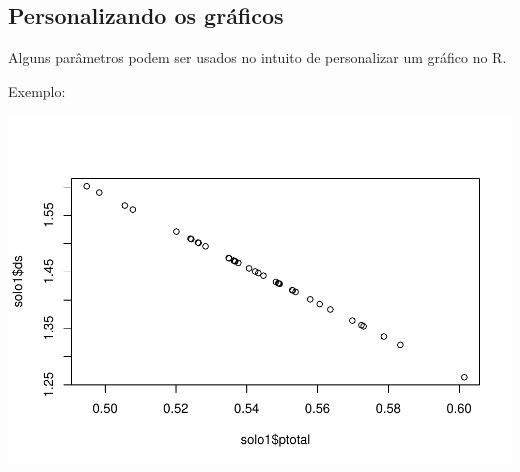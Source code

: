 \documentclass[]{book}
\newenvironment{Shaded}{\begin{snugshade}}{\end{snugshade}}
\newcommand{\KeywordTok}[1]{\textcolor[rgb]{0.13,0.29,0.53}{\textbf{#1}}}
\newcommand{\NormalTok}[1]{#1}
\newcommand{\OperatorTok}[1]{\textcolor[rgb]{0.81,0.36,0.00}{\textbf{#1}}}
\begin{document}
\hypertarget{personalizando-os-graficos}{%
\subsection{Personalizando os gráficos}\label{personalizando-os-graficos}}

Alguns parâmetros podem ser usados no intuito de personalizar um gráfico no R.

Exemplo:

\begin{Shaded}
\end{Shaded}

\includegraphics{TudodoR_files/figure-latex/unnamed-chunk-166-1.pdf}
\end{document}
